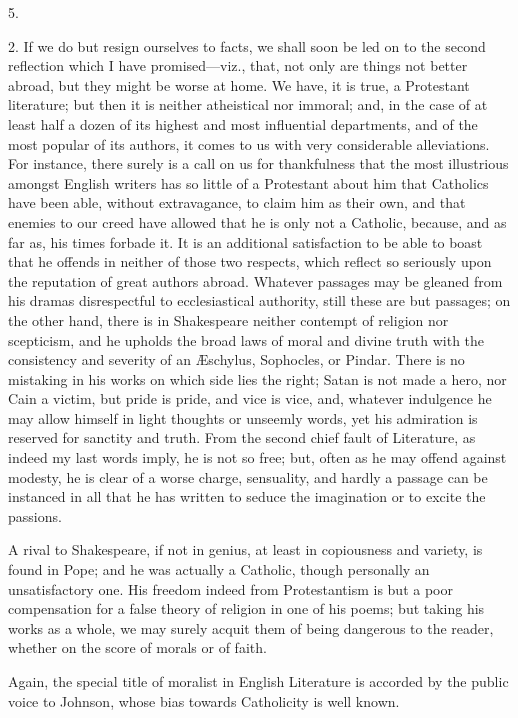 5.

2. If we do but resign ourselves to facts, we shall soon be led on
to the second reflection which I have promised—viz., that, not only
are things not better abroad, but they might be worse at home. We
have, it is true, a Protestant literature; but then it is neither
atheistical nor immoral; and, in the case of at least half a dozen of
its highest and most influential departments, and of the most
popular of its authors, it comes to us with very considerable
alleviations. For instance, there surely is a call on us for
thankfulness that the most illustrious amongst English writers has so
little of a Protestant about him that Catholics have been able,
without extravagance, to claim him as their own, and that enemies to
our creed have allowed that he is only not a Catholic, because, and as
far as, his times forbade it. It is an additional satisfaction to be
able to boast that he offends in neither of those two respects, which
reflect so seriously upon the reputation of great authors abroad.
Whatever passages may be gleaned from his dramas disrespectful to
ecclesiastical authority, still these are but passages; on the other
hand, there is in Shakespeare neither contempt of religion nor
scepticism, and he upholds the broad laws of moral and divine truth
with the consistency and severity of an Æschylus, Sophocles, or
Pindar. There is no mistaking in his works on which side lies the
right; Satan is not made a hero, nor Cain a victim, but pride is
pride, and vice is vice, and, whatever indulgence he may allow himself
in light thoughts or unseemly words, yet his admiration is reserved
for sanctity and truth. From the second chief fault of Literature, as
indeed my last words imply, he is not so free; but, often as he may
offend against modesty, he is clear of a worse charge, sensuality, and
hardly a passage can be instanced in all that he has written to seduce
the imagination or to excite the passions.

A rival to Shakespeare, if not in genius, at least in copiousness
and variety, is found in Pope; and he was actually a Catholic, though
personally an unsatisfactory one. His freedom indeed from
Protestantism is but a poor compensation for a false theory of
religion in one of his poems; but taking his works as a whole, we may
surely acquit them of being dangerous to the reader, whether on
the score of morals or of faith.

Again, the special title of moralist in English Literature is
accorded by the public voice to Johnson, whose bias towards
Catholicity is well known.

